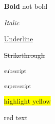 \documentclass{article}
\begin{document}
	\textbf{Bold }not bold



	\emph{Italic}



	\underline{Underline}



	\sout{Strikethrough}



	\textsubscript{subscript}



	\textsuperscript{superscript}



	\colorbox{yellow}{highlight yellow}



	{\color{FF0000}red text}



\end{document}
